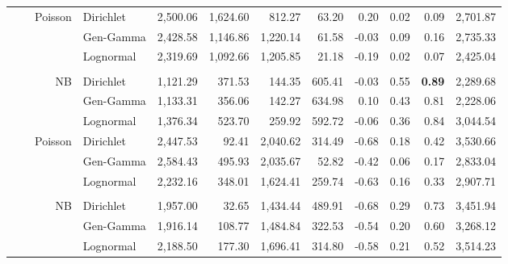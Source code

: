 \documentclass[12pt]{article}
\begin{document}
\begin{table}[!htb]
\begin{tabular}{>{\raggedleft\arraybackslash}p{0.40in} | >{\raggedleft\arraybackslash}p{0.45in} | r | >{\raggedleft\arraybackslash}p{0.85in} | r r r r r r r r}
& \multirow{7}{*}{HSGP}
 
& \multirow{3}{*}{Poisson}
& \cellcolor{delayC!25}Dirichlet      & 2{,}500.06 & 1{,}624.60 & 812.27  & 63.20  & 0.20  & 0.02 & 0.09 & 2{,}701.87 \\
& & & \cellcolor{delayB!25}Gen-Gamma   & 2{,}428.58 & 1{,}146.86 & 1{,}220.14 & 61.58 & -0.03 & 0.09 & 0.16 & 2{,}735.33 \\
& & & \cellcolor{delayA!25}Lognormal   & 2{,}319.69 & 1{,}092.66 & 1{,}205.85 & 21.18 & -0.19 & 0.02 & 0.07 & 2{,}425.04 \\
 
\\
 
& & \multirow{3}{*}{NB}
& \cellcolor{delayC!25}Dirichlet      & 1{,}121.29 & 371.53 & 144.35  & 605.41 & -0.03 & 0.55 & \bf 0.89 & 2{,}289.68 \\
& & & \cellcolor{delayB!25}Gen-Gamma   & 1{,}133.31 & 356.06 & 142.27  & 634.98 & 0.10  & 0.43 & 0.81 & 2{,}228.06 \\
& & & \cellcolor{delayA!25}Lognormal   & 1{,}376.34 & 523.70 & 259.92  & 592.72 & -0.06 & 0.36 & 0.84 & 3{,}044.54 \\
 
\midrule
 
& \multirow{7}{*}{SIR}
 
& \multirow{3}{*}{Poisson}
& \cellcolor{delayC!25}Dirichlet      & 2{,}447.53 & 92.41  & 2{,}040.62 & 314.49 & -0.68 & 0.18 & 0.42 & 3{,}530.66 \\
& & & \cellcolor{delayB!25}Gen-Gamma   & 2{,}584.43 & 495.93 & 2{,}035.67 & 52.82  & -0.42 & 0.06 & 0.17 & 2{,}833.04 \\
& & & \cellcolor{delayA!25}Lognormal   & 2{,}232.16 & 348.01 & 1{,}624.41 & 259.74 & -0.63 & 0.16 & 0.33 & 2{,}907.71 \\
 
\\
 
& & \multirow{3}{*}{NB}
& \cellcolor{delayC!25}Dirichlet      & 1{,}957.00 & 32.65  & 1{,}434.44 & 489.91 & -0.68 & 0.29 & 0.73 & 3{,}451.94 \\
& & & \cellcolor{delayB!25}Gen-Gamma   & 1{,}916.14 & 108.77 & 1{,}484.84 & 322.53 & -0.54 & 0.20 & 0.60 & 3{,}268.12 \\
& & & \cellcolor{delayA!25}Lognormal   & 2{,}188.50 & 177.30 & 1{,}696.41 & 314.80 & -0.58 & 0.21 & 0.52 & 3{,}514.23 \\
 
\midrule
 

\end{tabular}
\end{table}
\end{document}
